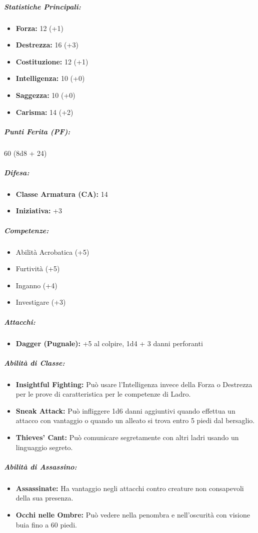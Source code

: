 \documentclass{article}
\begin{document}
\subparagraph*{Statistiche Principali:}
\begin{itemize}
  \item \textbf{Forza:} 12 (+1)
  \item \textbf{Destrezza:} 16 (+3)
  \item \textbf{Costituzione:} 12 (+1)
  \item \textbf{Intelligenza:} 10 (+0)
  \item \textbf{Saggezza:} 10 (+0)
  \item \textbf{Carisma:} 14 (+2)
\end{itemize}

\subparagraph*{Punti Ferita (PF):}
60 (8d8 + 24)

\subparagraph*{Difesa:}
\begin{itemize}
  \item \textbf{Classe Armatura (CA):} 14
  \item \textbf{Iniziativa:} +3
\end{itemize}

\subparagraph*{Competenze:}
\begin{itemize}
  \item Abilità Acrobatica (+5)
  \item Furtività (+5)
  \item Inganno (+4)
  \item Investigare (+3)
\end{itemize}

\subparagraph*{Attacchi:}
\begin{itemize}
  \item \textbf{Dagger (Pugnale):} +5 al colpire, 1d4 + 3 danni perforanti
\end{itemize}

\subparagraph*{Abilità di Classe:}
\begin{itemize}
  \item \textbf{Insightful Fighting:} Può usare l'Intelligenza invece della Forza o Destrezza per le prove di caratteristica per le competenze di Ladro.
  \item \textbf{Sneak Attack:} Può infliggere 1d6 danni aggiuntivi quando effettua un attacco con vantaggio o quando un alleato si trova entro 5 piedi dal bersaglio.
  \item \textbf{Thieves' Cant:} Può comunicare segretamente con altri ladri usando un linguaggio segreto.
\end{itemize}

\subparagraph*{Abilità di Assassino:}
\begin{itemize}
  \item \textbf{Assassinate:} Ha vantaggio negli attacchi contro creature non consapevoli della sua presenza.
  \item \textbf{Occhi nelle Ombre:} Può vedere nella penombra e nell'oscurità con visione buia fino a 60 piedi.
\end{itemize}
\end{document}
